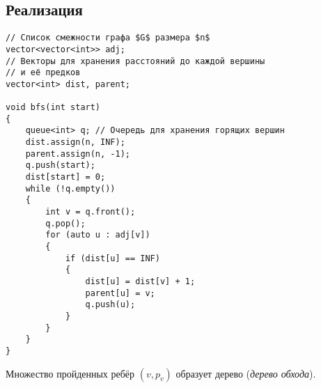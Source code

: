 \subsection{Реализация}

\begin{verbatim}
// Список смежности графа $G$ размера $n$
vector<vector<int>> adj;
// Векторы для хранения расстояний до каждой вершины
// и её предков
vector<int> dist, parent;

void bfs(int start)
{
    queue<int> q; // Очередь для хранения горящих вершин
    dist.assign(n, INF);
    parent.assign(n, -1);
    q.push(start);
    dist[start] = 0;
    while (!q.empty())
    {
        int v = q.front();
        q.pop();
        for (auto u : adj[v])
        {
            if (dist[u] == INF)
            {
                dist[u] = dist[v] + 1;
                parent[u] = v;
                q.push(u);
            }
        }
    }
}
\end{verbatim}

Множество пройденных ребёр $(v, p_v)$ образует дерево (\textit{дерево обхода}).

